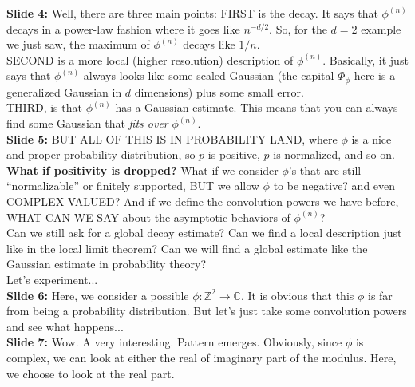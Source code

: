 \documentclass[11pt]{article}
\begin{document}
\noindent \textbf{Slide 4:} Well, there are three main points: FIRST is the decay. It says that $\phi^{(n)}$ decays in a power-law fashion where it goes like $n^{-d/2}$. So, for the $d=2$ example we just saw, the maximum of $\phi^{(n)}$ decays like $1/n$. \\


SECOND is a more local (higher resolution) description of $\phi^{(n)}$. Basically, it just says that $\phi^{(n)}$ always looks like some scaled Gaussian (the capital $\Phi_\phi$ here is a generalized Gaussian in $d$ dimensions) plus some small error. \\


THIRD, is that $\phi^{(n)}$ has a Gaussian estimate. This means that you can always find some Gaussian that \textit{fits over} $\phi^{(n)}$. \\




\noindent \textbf{Slide 5:} BUT ALL OF THIS IS IN PROBABILITY LAND, where $\phi$ is a nice and proper probability distribution, so $p$ is positive, $p$ is normalized, and so on. \\

\textbf{What if positivity is dropped?} What if we consider $\phi$'s that are still ``normalizable'' or finitely supported, BUT we allow $\phi$ to be negative? and even COMPLEX-VALUED? And if we define the convolution powers we have before, WHAT CAN WE SAY about the asymptotic behaviors of $\phi^{(n)}$? \\

Can we still ask for a global decay estimate? Can we find a local description just like in the local limit theorem? Can we will find a global estimate like the Gaussian estimate in  probability theory? \\


Let's experiment...\\


\noindent \textbf{Slide 6:} Here, we consider a possible $\phi: \mathbb{Z}^2 \to \mathbb{C}$. It is obvious that this $\phi$ is far from being a probability distribution. But let's just take some convolution powers and see what happens...\\



\noindent \textbf{Slide 7:} Wow. A very interesting.  Pattern emerges. Obviously, since $\phi$ is complex, we can look at either the real of imaginary part of the modulus. Here, we choose to look at the real part. \\
\end{document}
